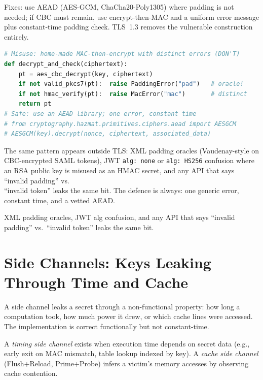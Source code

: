 Fixes: use AEAD (AES-GCM, ChaCha20-Poly1305) where padding is not needed; if CBC must remain, use encrypt-then-MAC and a uniform error message plus constant-time padding check. TLS~1.3 removes the vulnerable construction entirely.

\begin{lstlisting}[language=Python]
# Misuse: home-made MAC-then-encrypt with distinct errors (DON'T)
def decrypt_and_check(ciphertext):
    pt = aes_cbc_decrypt(key, ciphertext)
    if not valid_pkcs7(pt):  raise PaddingError("pad")   # oracle!
    if not hmac_verify(pt):  raise MacError("mac")       # distinct
    return pt
# Safe: use an AEAD library; one error, constant time
# from cryptography.hazmat.primitives.ciphers.aead import AESGCM
# AESGCM(key).decrypt(nonce, ciphertext, associated_data)
\end{lstlisting}

The same pattern appears outside TLS: XML padding oracles (Vaudenay-style on CBC-encrypted SAML tokens), JWT \texttt{alg: none} or \texttt{alg: HS256} confusion where an RSA public key is misused as an HMAC secret, and any API that says ``invalid padding'' vs.\\ ``invalid token'' leaks the same bit. The defence is always: one generic error, constant time, and a vetted AEAD.

 XML padding oracles, JWT alg confusion, and any API that says ``invalid padding'' vs.\ ``invalid token'' leaks the same bit.

\section{Side Channels: Keys Leaking Through Time and Cache}
\label{sec:side-channels}
A side channel leaks a secret through a non-functional property: how long a computation took, how much power it drew, or which cache lines were accessed. The implementation is correct functionally but not constant-time.

\begin{definition}
A \emph{timing side channel} exists when execution time depends on secret data (e.g., early exit on MAC mismatch, table lookup indexed by key). A \emph{cache side channel} (Flush+Reload, Prime+Probe) infers a victim's memory accesses by observing cache contention.
\end{definition}


